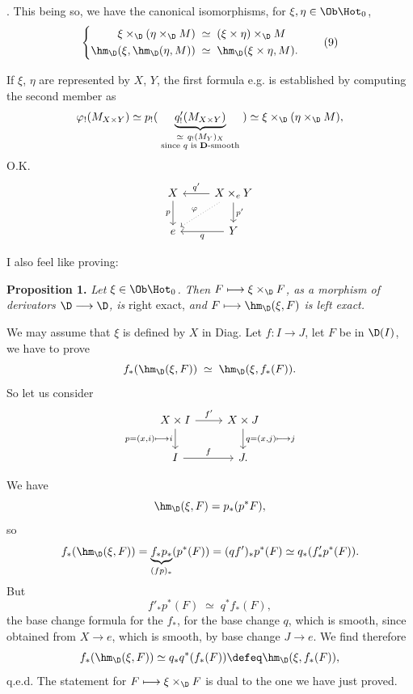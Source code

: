 
. This being so, we have the canonical isomorphisms, for $\xi,\eta\in\Ob\Hot_0$,
\[
\left\{
\begin{aligned}
\xi\times_{\D}(\eta\times_{\D}M) &\;\simeq\; (\xi\times\eta)\times_{\D}M\\
\hm_{\D}(\xi,\hm_{\D}(\eta,M)) &\;\simeq\; \hm_{\D}(\xi\times\eta,M).
\end{aligned}
\right.
\tag*{(9)}
\]

If $\xi$, $\eta$ are represented by $X$, $Y$, the first formula e.g.
is established by computing the second member as
\[
\varphi_!(M_{X\times Y})\simeq p_!(\;\underbrace{q'_!(M_{X\times Y})}_{\substack{\simeq\ q_!(M_Y)_X\\ \text{since $q$ is $\mathbf{D}$-smooth}}}\;)\simeq\xi\times_{\D}(\eta\times_{\D}M),
\]
O.K.
\[
\begin{tikzcd}
X \ar[d,"p"'] & X\times_e Y \ar[l,"q'"'] \ar[d,"p'"] \ar[dl,dotted,"\varphi"'] \\
e & Y \ar[l,"q"]
\end{tikzcd}
\]

I also feel like proving:

\textbf{Proposition 1.} \textit{Let $\xi\in\Ob\Hot_0$. Then $F\longmapsto\xi\times_{\D}F$, as a morphism of derivators $\D\longrightarrow\D$, is} right exact, \textit{and $F\longmapsto\hm_{\D}(\xi,F)$ is left exact.}

We may assume that $\xi$ is defined by $X$ in Diag. Let $f:I\longrightarrow J$, let $F$ be in $\D(I)$, we have to prove
\[
f_*(\hm_{\D}(\xi,F))\;\simeq\;\hm_{\D}(\xi,f_*(F)).
\]
So let us consider
\[
\begin{tikzcd}
X\times I \ar[r,"f'"] \ar[d,"{p=(x,i)\longmapsto i}"'] & X\times J \ar[d,"{q=(x,j)\longmapsto j}"] \\
I \ar[r,"f"] & J.
\end{tikzcd}
\]

We have
\[
\hm_{\D}(\xi,F)=p_*(p^*F),
\]
so
\[
f_*(\hm_{\D}(\xi,F))=\underbrace{f_*p_*}_{(fp)_*}(p^*(F))=(qf')_*p^*(F)\simeq q_*(f'_*p^*(F)).
\]
But
\[
f'_*p^*(F)\;\simeq\;q^*f_*(F),
\]
the base change formula for the $f_*$, for the base change $q$, which is smooth, since obtained from $X\longrightarrow e$, which is smooth, by base change $J\longrightarrow e$. We find
therefore
\[
f_*(\hm_{\D}(\xi,F))\simeq q_*q^*(f_*(F))\defeq\hm_{\D}(\xi,f_*(F)),
\]
q.e.d. The statement for $F\longmapsto\xi\times_{\D}F$ is dual to the one we have just proved.

